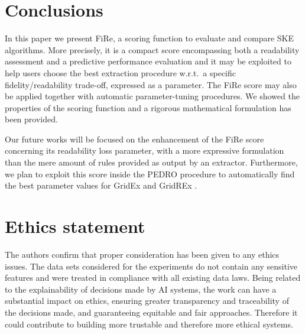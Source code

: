 \documentclass{article}
\newcommand{\gridex}{GridEx}
\newcommand{\gridrex}{GridREx}
\newcommand{\pedro}{\textsc{PEDRO}}
\newcommand{\fire}{FiRe}
\begin{document}
\section{Conclusions}\label{sec:conclusions}

In this paper we present \fire{}, a scoring function to evaluate and compare SKE algorithms.
%
More precisely, it is a compact score encompassing both a readability assessment and a predictive performance evaluation and it may be exploited to help users choose the best extraction procedure w.r.t.\ a specific fidelity/readability trade-off, expressed as a parameter.
%
The \fire{} score may also be applied together with automatic parameter-tuning procedures.
%
We showed the properties of the scoring function and a rigorous mathematical formulation has been provided.

Our future works will be focused on the enhancement of the \fire{} score concerning its readability loss parameter, with a more expressive formulation than the mere amount of rules provided as output by an extractor.
%
Furthermore, we plan to exploit this score inside the \pedro{} procedure \cite{putciteRefer3person} to automatically find the best parameter values for \gridex{} and \gridrex{} \cite{putcite}.


\section*{Ethics statement}
The authors confirm that proper consideration has been given to any ethics issues. The data sets considered for the experiments do not contain any sensitive features and were treated in compliance with all existing data laws. Being related to the explainability of decisions made by AI systems, the work can have a substantial impact on ethics, ensuring greater transparency and traceability of the decisions made, and guaranteeing equitable and fair approaches. Therefore it could contribute to building more trustable and therefore more ethical systems.



\end{document}
